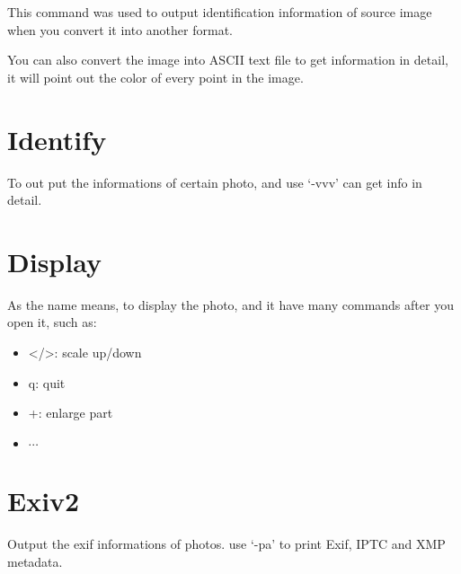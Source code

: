 \documentclass[12pt]{article}
\begin{document}
This command was used to output identification information of source image when you convert it into another format.

You can also convert the image into ASCII text file to get information in detail, it will point out the color of every point in the image.

\section{Identify}
To out put the informations of certain photo, and use `-vvv' can get info in detail.
\section{Display}
As the name means, to display the photo, and it have many commands after you open it, such as:
\begin{itemize}
	\item </>: scale up/down
	\item q: quit
	\item +: enlarge part
	\item $\cdots$
\end{itemize}
\section{Exiv2}
Output the exif informations of photos. use `-pa' to print Exif, IPTC and XMP metadata.
\end{document}
